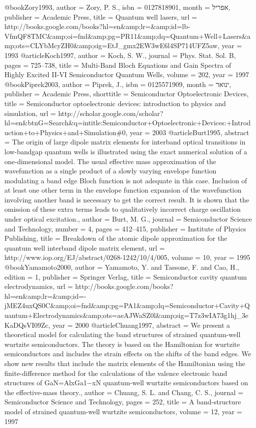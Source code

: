@book{Zory1993,
author = {Zory, P. S.},
isbn = {0127818901},
month = {אפריל},
publisher = {Academic Press},
title = {{Quantum well lasers}},
url = {http://books.google.com/books?hl=en\&amp;lr=\&amp;id=lb-VfmQF8TMC\&amp;oi=fnd\&amp;pg=PR11\&amp;dq=Quantum+Well+Lasers\&amp;ots=CLYbMcyZH0\&amp;sig=EtJ\_gmx2EW3wE6l4SP714UFZ5aw},
year = {1993}
}
@article{Koch1997,
author = {Koch, S. W.},
journal = {Phys. Stat. Sol. B},
pages = {725--738},
title = {{Multi-Band Bloch Equations and Gain Spectra of Highly Excited II-VI Semiconductor Quantum Wells}},
volume = {202},
year = {1997}
}
@book{Piprek2003,
author = {Piprek, J.},
isbn = {0125571909},
month = {ינואר},
publisher = {Academic Press},
shorttitle = {Semiconductor Optoelectronic Devices},
title = {{Semiconductor optoelectronic devices: introduction to physics and simulation}},
url = {http://scholar.google.com/scholar?hl=en\&btnG=Search\&q=intitle:Semiconductor+Optoelectronic+Devices:+Introduction+to+Physics+and+Simulation\#0},
year = {2003}
}
@article{Burt1995,
abstract = {The origin of large dipole matrix elements for interband optical transitions in low-bandgap quantum wells is illustrated using the exact numerical solution of a one-dimensional model. The usual effective mass approximation of the wavefunction as a single product of a slowly varying envelope function modulating a band edge Bloch function is not adequate in this case. Inclusion of at least one other term in the envelope function expansion of the wavefunction involving another band is necessary to get the correct result. It is shown that the omission of these extra terms leads to qualitatively incorrect charge oscillation under optical excitation.},
author = {Burt, M. G.},
journal = {Semiconductor Science and Technology},
number = {4},
pages = {412--415},
publisher = {Institute of Physics Publishing},
title = {{Breakdown of the atomic dipole approximation for the quantum well interband dipole matrix element}},
url = {http://www.iop.org/EJ/abstract/0268-1242/10/4/005},
volume = {10},
year = {1995}
}
@book{Yamamoto2000,
author = {Yamamoto, Y. and Tassone, F. and Cao, H.},
edition = {1},
publisher = {Springer Verlag},
title = {{Semiconductor cavity quantum electrodynamics}},
url = {http://books.google.com/books?hl=en\&amp;lr=\&amp;id=-jMEZ4uxQS0C\&amp;oi=fnd\&amp;pg=PA1\&amp;dq=Semiconductor+Cavity+Quantum+Electrodynamics\&amp;ots=aeAJWaSZ0l\&amp;sig=T7z3wIA73g1hj\_3eKaDQsVI09Zc},
year = {2000}
}
@article{Chuang1997,
abstract = {We present a theoretical model for calculating the band structures of strained quantum-well wurtzite semiconductors. The theory is based on the Hamiltonian for wurtzite semiconductors and includes the strain effects on the shifts of the band edges. We show new results that include the matrix elements of the Hamiltonian using the finite-difference method for the calculations of the valence electronic band structures of GaN=AlxGa1−xN quantum-well wurtzite semiconductors based on the effective-mass theory.},
author = {Chuang, S. L. and Chang, C. S.},
journal = {Semiconductor Science and Technology},
pages = {252},
title = {{A band-structure model of strained quantum-well wurtzite semiconductors}},
volume = {12},
year = {1997}
}
